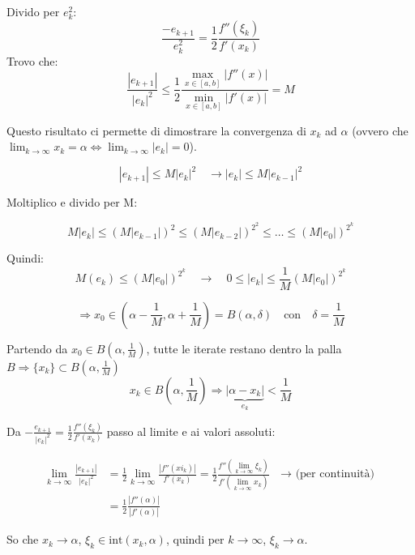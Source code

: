 \documentclass[a4paper, 11pt]{article}
\begin{document}
        Divido per $e_k^2:$
        \[
        \frac{-e_{k+1}}{e_k^2} = \frac{1}{2} \frac{f''(\xi_k)}{f'(x_k)}
        \]
        Trovo che:
        \[
            \frac{|e_{k+1}|}{|e_k|^2} \leq \frac{1}{2} \frac{\max_{x \in [a,b]} |f''(x)|}{\min_{x \in [a,b]}|f'(x)|} = M
        \]

        Questo risultato ci permette di dimostrare la convergenza di \( x_k \) ad \( \alpha \) (ovvero che \(\lim_{k \to \infty} x_k = \alpha \iff \lim_{k \to \infty} |e_k| = 0\)).

        \[
            |e_{k+1}| \leq M |e_k|^2 \quad \rightarrow |e_k| \leq M |e_{k-1}|^2
        \]
        
        Moltiplico e divido per M:

        \[
            M|e_k| \leq (M |e_{k-1}|)^2 \leq (M|e_{k-2}|)^{2^2} \leq \ldots \leq (M|e_0|)^{2^k}
        \]

        Quindi:
        \[
            M(e_k) \leq (M|e_0|)^{2^k} \quad \rightarrow \quad 0 \leq |e_k| \leq \frac{1}{M} (M |e_0|)^{2^k}
        \]

        \[
            \Rightarrow x_0 \in \left( \alpha - \frac{1}{M}, \alpha + \frac{1}{M} \right) = B(\alpha, \delta) \quad \text{con} \quad \delta = \frac{1}{M}
        \]

        Partendo da $x_0 \in B(\alpha, \frac{1}{M})$, tutte le iterate restano dentro la palla $B \Rightarrow \{x_k\} \subset B(\alpha, \frac{1}{M})$
        \[
            x_k \in B(\alpha, \frac{1}{M}) \Rightarrow \underbrace{|\alpha - x_k|}_{e_k} < \frac{1}{M}
        \]

        Da $-\frac{e_{k+1}}{|e_k|^2} = \frac{1}{2} \frac{f''(\xi _k)}{f'(x_k)}$ passo al limite e ai valori assoluti:

        \begin{align*}
            \lim_{k \to \infty} \frac{|e_{k+1}|}{|e_k|^2} &= \frac{1}{2} \lim_{k \to \infty} \frac{|f''(xi_k)|}{f'(x_k)} = \frac{1}{2} \frac{f''(\lim_{k \to \infty} \xi_k)}{f'(\lim_{k \to \infty} x_k)} \text{ $\rightarrow$ (per continuità)} \\
            &= \frac{1}{2} \frac{|f''(\alpha)|}{|f'(\alpha)|}
        \end{align*}
            

        So che $x_k \to \alpha$, $\xi_k \in \text{int}(x_k, \alpha)$, quindi per $k \to \infty$, $\xi_k \to \alpha$.
                        
        \paragraph{}
        
\end{document}
